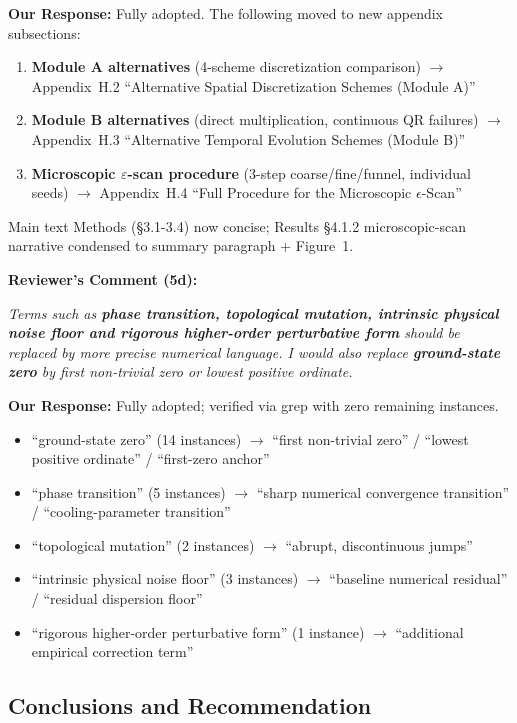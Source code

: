 \documentclass[11pt]{article}
\begin{document}
\noindent\textbf{Our Response:} Fully adopted. The following moved to new appendix subsections:
\begin{enumerate}
\item \textbf{Module A alternatives} (4-scheme discretization comparison) $\to$ Appendix~H.2 ``Alternative Spatial Discretization Schemes (Module A)''
\item \textbf{Module B alternatives} (direct multiplication, continuous QR failures) $\to$ Appendix~H.3 ``Alternative Temporal Evolution Schemes (Module B)''
\item \textbf{Microscopic $\varepsilon$-scan procedure} (3-step coarse/fine/funnel, individual seeds) $\to$ Appendix~H.4 ``Full Procedure for the Microscopic $\epsilon$-Scan''
\end{enumerate}
Main text Methods (\S3.1-3.4) now concise; Results \S4.1.2 microscopic-scan narrative condensed to summary paragraph + Figure~1.

\vspace{0.3cm}
\noindent\textbf{Reviewer's Comment (5d):}
\begin{quotebox}
\itshape Terms such as \textbf{phase transition, topological mutation, intrinsic physical noise floor and rigorous higher-order perturbative form} should be replaced by more precise numerical language. I would also replace \textbf{ground-state zero} by first non-trivial zero or lowest positive ordinate.
\end{quotebox}

\noindent\textbf{Our Response:} Fully adopted; verified via grep with zero remaining instances.
\begin{itemize}
\item ``ground-state zero'' (14 instances) $\to$ ``first non-trivial zero'' / ``lowest positive ordinate'' / ``first-zero anchor''
\item ``phase transition'' (5 instances) $\to$ ``sharp numerical convergence transition'' / ``cooling-parameter transition''
\item ``topological mutation'' (2 instances) $\to$ ``abrupt, discontinuous jumps''
\item ``intrinsic physical noise floor'' (3 instances) $\to$ ``baseline numerical residual'' / ``residual dispersion floor''
\item ``rigorous higher-order perturbative form'' (1 instance) $\to$ ``additional empirical correction term''
\end{itemize}

\subsection*{Conclusions and Recommendation}
\end{document}
